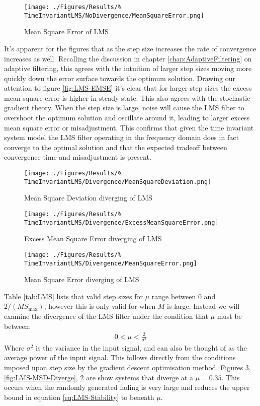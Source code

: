 \begin{figure}[ht]
	\centering
	\texttt{[image: ./Figures/Results/\%
	TimeInvariantLMS/NoDivergence/MeanSquareError.png]}
	\caption{Mean Square Error of LMS}
	\label{fig:LMS-MSE}
\end{figure}
It's apparent for the figures that as the step size increases the %
rate of convergence increases as well. Recalling the discussion in %
chapter \ref{chap:AdaptiveFiltering} on adaptive filtering, this agrees %
with the intuition of larger step sizes moving more quickly down the error %
surface towards the optimum solution. Drawing our attention to figure %
\ref{fig:LMS-EMSE} it's clear that for larger step sizes the excess %
mean square error is higher in steady state. This also agrees with the %
stochastic gradient theory. When the step size is large, noise will cause %
the LMS filter to overshoot the optimum solution and oscillate around it, %
leading to larger excess mean square error or misadjustment. This confirms %
that given the time invariant system model the LMS filter operating in the %
frequency domain does in fact converge to the optimal solution and that %
the expected tradeoff between convergence time and misadjustment is %
present.
\begin{figure}[ht]
	\centering
	\begin{minipage}{0.49\textwidth}
		\texttt{[image: ./Figures/Results/\%
		TimeInvariantLMS/Divergence/MeanSquareDeviation.png]}
		\caption{Mean Square Deviation diverging of LMS}
		\label{fig:LMS-MSD-Diverge}
	\end{minipage}
	\begin{minipage}{0.49\textwidth}
		\texttt{[image: ./Figures/Results/\%
		TimeInvariantLMS/Divergence/ExcessMeanSquareError.png]}
		\caption{Excess Mean Square Error diverging of LMS}
		\label{fig:LMS-EMSE-Diverge}
	\end{minipage}
\end{figure}
\begin{figure}[ht]
	\centering
	\texttt{[image: ./Figures/Results/\%
	TimeInvariantLMS/Divergence/MeanSquareError.png]}
	\caption{Mean Square Error diverging of LMS}
	\label{fig:LMS-MSE-Diverge}
\end{figure}
Table \ref{tab:LMS} lists that valid step sizes for $\mu$ range between %
$0$ and $2/(M S_{\text{max}})$, however this is only valid for when %
$M$ is large. Instead we will examine the divergence of the LMS filter %
under the condition that $\mu$ must be between:
\begin{align}
	0 < \mu < \frac{2}{\sigma^{2}}
	\label{eq:LMS-Stability}
\end{align}
Where $\sigma^{2}$ is the variance in the input signal, and can also %
be thought of as the average power of the input signal. This follows %
directly from the conditions imposed upon step size by the gradient %
descent optimisation method. Figures \ref{fig:LMS-MSE-Diverge}, %
\ref{fig:LMS-MSD-Diverge}, \ref{fig:LMS-EMSE-Diverge} are %
show systems that diverge at a $\mu = 0.35$. This occurs %
when the randomly generated fading is very large and reduces %
the upper bound in equation \ref{eq:LMS-Stability} to beneath %
$\mu$.
\FloatBarrier
